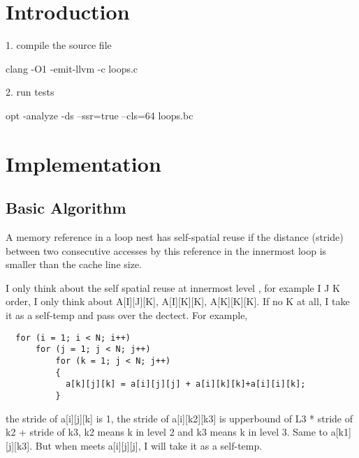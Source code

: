 


\label{Chapter1} %



\section{Introduction}

1. compile  the source file

clang -O1 -emit-llvm -c loops.c 

2. run tests   

opt -analyze -ds --ssr=true --cls=64 loops.bc

\section{Implementation}
\subsection{Basic Algorithm}
A memory reference in a loop nest has self-spatial reuse if the
distance (stride) between two consecutive accesses by this reference
in the innermost loop is smaller than the cache line size.

I only think about the self spatial reuse at innermost level ,
 for example I J K order, I only think about
 A[I][J][K], A[I][K][K], A[K][K][K].
If no K at all, I take it as a self-temp and pass over the dectect.
For example,
\begin{lstlisting}
  for (i = 1; i < N; i++)
      for (j = 1; j < N; j++)
          for (k = 1; j < N; j++)
          {
            a[k][j][k] = a[i][j][j] + a[i][k][k]+a[i][i][k];
          }
\end{lstlisting}
the stride of a[i][j][k] is 1, the stride of a[i][k2][k3] is
upperbound of L3 * stride of k2 + stride of k3, k2 means k in level
2 and k3 means k in level 3. Same to a[k1][j][k3]. But when meets
a[i][j][j], I will take it as a self-temp. 

